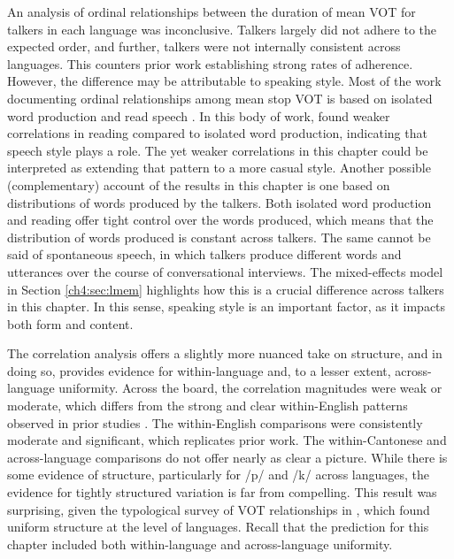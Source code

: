 An analysis of ordinal relationships between the duration of mean VOT for talkers in each language was inconclusive. Talkers largely did not adhere to the expected order, and further, talkers were not internally consistent across languages. This counters prior work establishing strong rates of adherence. However, the difference may be attributable to speaking style. Most of the work documenting ordinal relationships among mean stop VOT is based on isolated word production and read speech \citep[e.g.,][]{chodroff_2017_structure, cho_1999_vot, lisker_1964_vot}. In this body of work, \citet{chodroff_2017_structure} found weaker correlations in reading compared to isolated word production, indicating that speech style plays a role. The yet weaker correlations in this chapter could be interpreted as extending that pattern to a more casual style. Another possible (complementary) account of the results in this chapter is one based on distributions of words produced by the talkers. Both isolated word production and reading offer tight control over the words produced, which means that the distribution of words produced is constant across talkers. The same cannot be said of spontaneous speech, in which talkers produce different words and utterances over the course of conversational interviews. The mixed-effects model in Section \ref{ch4:sec:lmem} highlights how this is a crucial difference across talkers in this chapter. In this sense, speaking style is an important factor, as it impacts both form and content. 

The correlation analysis offers a slightly more nuanced take on structure, and in doing so, provides evidence for within-language and, to a lesser extent, across-language uniformity. Across the board, the correlation magnitudes were weak or moderate, which differs from the strong and clear within-English patterns observed in prior studies \citep{chodroff_2017_structure, chodroff_2019_l2}. The within-English comparisons were consistently moderate and significant, which replicates prior work. The within-Cantonese and across-language comparisons do not offer nearly as clear a picture. While there is some evidence of structure, particularly for /p/ and /k/ across languages, the evidence for tightly structured variation is far from compelling. This result was surprising, given the typological survey of VOT relationships in \citet{chodroff_2019_covariation}, which found uniform structure at the level of languages. Recall that the prediction for this chapter included both within-language and across-language uniformity. 

